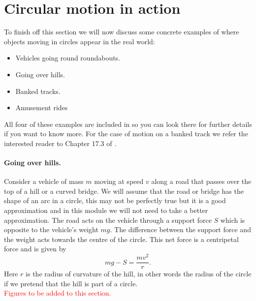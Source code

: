 \documentclass[a4paper,12pt]{book}
\begin{document}
\section{Circular motion in action}
To finish off this section we will now discuss some concrete examples of where objects moving in circles appear in the real world:
\begin{itemize}
\setlength{\itemsep}{-5pt}
    \item Vehicles going round roundabouts.
    \item Going over hills.
    \item Banked tracks.
    \item Amusement rides
\end{itemize} 
All four of these examples are included in \citep{breithaupt2016aqa} so you can look there for further details if you want to know more.  For the case of motion on a banked track we refer the interested reader to Chapter 17.3 of \citep{breithaupt2016aqa}.

\paragraph{Going over hills.} Consider a vehicle of mass $m$ moving at speed $v$ along a road that passes over the top of a hill or a curved bridge. We will assume that the road or bridge has the shape of an arc in a circle, this may not be perfectly true but it is a good approximation and in this module we will not need to take a better approximation. The road acts on the vehicle through a support force $S$ which is opposite to the vehicle's weight $mg$. The difference between the support force and the weight acts towards the centre of the circle. This net force is a centripetal force and is given by
\begin{equation*}
mg-S=\frac{mv^{2}}{r}.
\end{equation*}
Here $r$ is the radius of curvature of the hill, in other words the radius of the circle if we pretend that the hill is part of a circle.\\

\textcolor{red}{Figures to be added to this section.}\\
\end{document}
